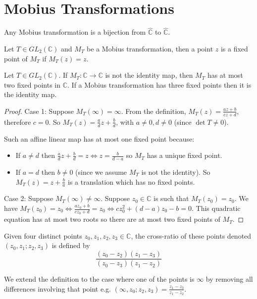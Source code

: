 \section{Mobius Transformations}

\begin{corollary}
	Any Mobius transformation is a bijection from $\hat{\mathbb{C}}$ to $\hat{\mathbb{C}}$.
\end{corollary}

Let $T \in GL_2(\mathbb{C})$ and $M_T$ be a Mobius transformation, then a point $z$ is a fixed point of $M_T$ if $M_T(z) = z$.

\begin{lemma}
	Let $T \in GL_2(\mathbb{C})$. If $M_T: \mathbb{C} \rightarrow \mathbb{C}$ is not the identity map, then $M_T$ has at most two fixed points in $\mathbb{C}$. If a Mobius transformation has three fixed points then it is the identity map.
\end{lemma}

\begin{proof}
	Case 1: Suppose $M_T(\infty) = \infty$. From the definition, $M_T(z) = \frac{az + b}{cz + d}$, therefore $c = 0$. So $M_T(z) = \frac{a}{d}z + \frac{b}{d}$, with $a \ne 0, d \ne 0$ (since $\det T \ne 0$).

	Such an affine linear map has at most one fixed point because:
	\begin{itemize}
		\item If $a \ne d$ then $\frac{a}{d}z + \frac{b}{d} = z \Longleftrightarrow z = \frac{b}{d - a}$ so $M_T$ has a unique fixed point.
		\item If $a = d$ then $b \ne 0$ (since we assume $M_T$ is not the identity). So $M_T(z) = z + \frac{b}{a}$ is a translation which has no fixed points.
	\end{itemize}

	Case 2: Suppose $M_T(\infty) \ne \infty$. Suppose $z_0 \in \mathbb{C}$ is such that $M_T(z_0) = z_0$. We have $M_T(z_0) = z_0 \Longleftrightarrow \frac{a z_0 + b}{c z_0 + d} = z_0 \Longleftrightarrow c z_0 ^ 2 + (d - a)z_0 - b = 0$. This quadratic equation has at most two roots so there are at most two fixed points of $M_T$.
\end{proof}

\begin{definition}
	Given four distinct points $z_0, z_1, z_2, z_3 \in \mathbb{C}$, the cross-ratio of these points denoted $(z_0, z_1; z_2, z_3)$ is defined by
	\[\frac{(z_0 - z_2)(z_1 - z_3)}{(z_0 - z_3)(z_1 - z_2)}\]

	We extend the definition to the case where one of the points is $\infty$ by removing all differences involving that point e.g. $(\infty, z_0; z_2, z_3) = \frac{z_1 - z_3}{z_1 - z_2}$.
\end{definition}

